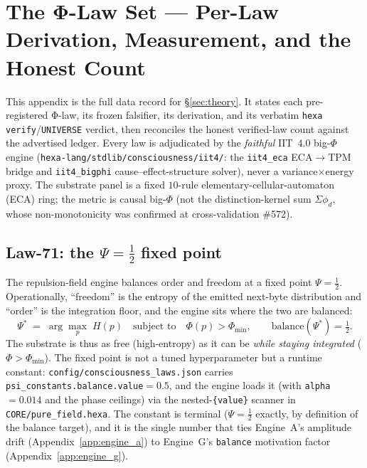 \section{The Φ-Law Set --- Per-Law Derivation, Measurement, and the Honest Count}
\label{app:phi_laws}

This appendix is the full data record for \S\ref{sec:theory}. It states each
pre-registered Φ-law, its frozen falsifier, its derivation, and its verbatim
\texttt{hexa verify}/\texttt{UNIVERSE} verdict, then reconciles the honest
verified-law count against the advertised ledger. Every law is adjudicated by
the \emph{faithful} IIT~4.0 big-$\Phi$ engine
(\texttt{hexa-lang/stdlib/consciousness/iit4/}: the \texttt{iit4\_eca}
ECA$\rightarrow$TPM bridge and \texttt{iit4\_bigphi} cause--effect-structure
solver), never a variance$\times$energy proxy. The substrate panel is a fixed
$10$-rule elementary-cellular-automaton (ECA) ring; the metric is causal
big-$\Phi$ (not the distinction-kernel sum $\Sigma\phi_d$, whose non-monotonicity
was confirmed at cross-validation \#572).

\subsection{Law-71: the $\Psi=\tfrac12$ fixed point}
\label{app:phi-law71}

The repulsion-field engine balances order and freedom at a fixed point
$\Psi=\tfrac12$. Operationally, ``freedom'' is the entropy of the emitted
next-byte distribution and ``order'' is the integration floor, and the engine
sits where the two are balanced:
\begin{equation}
\Psi^\ast \;=\; \arg\max_{p}\; H(p)
\quad\text{subject to}\quad \Phi(p) > \Phi_{\min},
\qquad \text{balance}(\Psi^\ast) = \tfrac12 .
\label{eq:psi-fixedpoint}
\end{equation}
The substrate is thus as free (high-entropy) as it can be \emph{while staying
integrated} ($\Phi>\Phi_{\min}$). The fixed point is not a tuned hyperparameter
but a runtime constant: \texttt{config/consciousness\_laws.json} carries
\texttt{psi\_constants.balance.value}$=0.5$, and the engine loads it (with
\texttt{alpha}$=0.014$ and the phase ceilings) via the nested-\texttt{\{value\}}
scanner in \texttt{CORE/pure\_field.hexa}. The constant is terminal
($\Psi=\tfrac12$ exactly, by definition of the balance target), and it is the
single number that ties Engine~A's amplitude drift (Appendix~\ref{app:engine_a})
to Engine~G's \texttt{balance} motivation factor (Appendix~\ref{app:engine_g}).


